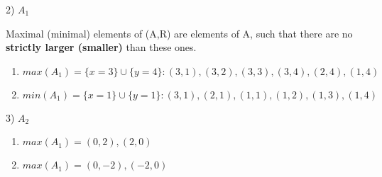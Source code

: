2) $A_1$

Maximal (minimal) elements of (A,R) are elements of A, such that there are no \textbf{strictly larger (smaller)} than these ones.

\begin{enumerate}
\item $max(A_1) = \{x = 3\} \cup \{y = 4\}: (3, 1), (3, 2), (3, 3), (3, 4), (2, 4), (1, 4)$
\item $min(A_1) = \{x=1\} \cup \{y=1\}: (3, 1), (2, 1), (1, 1), (1, 2), (1, 3), (1, 4) $
\end{enumerate}

3) $A_2$

\begin{enumerate}
\item $max(A_1) = (0,2), (2,0)$
\item $max(A_1) = (0,-2), (-2,0)$
\end{enumerate}